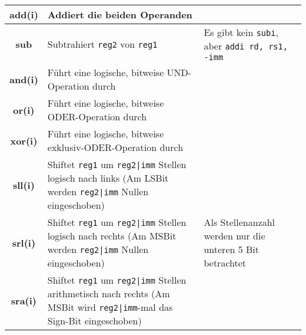 {\begin{tabular}{|c|p{8cm}|p{4cm}|}
	\hline
	\textbf{add(i)} & Addiert die beiden Operanden & \\
	\hline
	\textbf{sub} & Subtrahiert \texttt{reg2} von \texttt{reg1}& Es gibt kein \texttt{subi}, aber \texttt{addi rd, rs1, -imm} \\
	\hline
	\textbf{and(i)} & Führt eine logische, bitweise UND-Operation durch & \\
	\hline
	\textbf{or(i)} & Führt eine logische, bitweise ODER-Operation durch & \\
	\hline
	\textbf{xor(i)} & Führt eine logische, bitweise exklusiv-ODER-Operation durch & \\
	\hline
	\textbf{sll(i)} & Shiftet \texttt{reg1} um \texttt{reg2|imm} Stellen logisch nach links (Am LSBit werden \texttt{reg2|imm} Nullen eingeschoben) & \multirow{3}{4cm}{Als Stellenanzahl werden nur die unteren 5 Bit betrachtet} \\
	\cline{1-2}
	\textbf{srl(i)} & Shiftet \texttt{reg1} um \texttt{reg2|imm} Stellen logisch nach rechts (Am MSBit werden \texttt{reg2|imm} Nullen eingeschoben) & \\
	\cline{1-2}
	\textbf{sra(i)} & Shiftet \texttt{reg1} um \texttt{reg2|imm} Stellen arithmetisch nach rechts (Am MSBit wird \texttt{reg2|imm}-mal das Sign-Bit eingeschoben) & \\
	\hline
\end{tabular}

}
